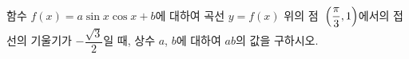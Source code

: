 함수 $f(x)=a\sin x\cos x+b$에 대하여 곡선 $y=f(x)$ 위의 점~$\left(\dfrac{\pi}{3}{,}\mkern3mu\mathopen{}1\right)$에서의 접선의 기울기가 $-\dfrac{\sqrt{3}}{2}$일 때, 상수 $a$, $b$에 대하여 $ab$의 값을 구하시오.
